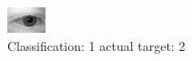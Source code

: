 \begin{figure}[h!]
\begin{center}
\includegraphics[width=0.60\columnwidth]{figures/ID468_class_1_target_2.png}
\end{center}
\caption{ Classification: 1 actual target: 2}
\label{fig:ID468_class_1_target_2}
\end{figure}

